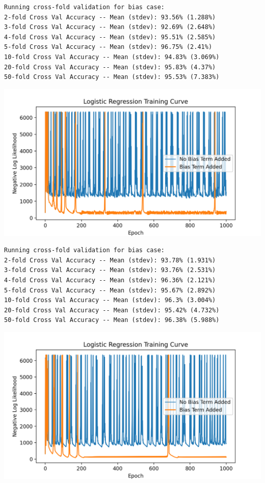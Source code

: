 \documentclass{article}
\theoremstyle{definition}
\begin{document}
\begin{mdframed}[]
    \begin{verbatim}
Running cross-fold validation for bias case:
2-fold Cross Val Accuracy -- Mean (stdev): 93.56% (1.288%)
3-fold Cross Val Accuracy -- Mean (stdev): 92.69% (2.648%)
4-fold Cross Val Accuracy -- Mean (stdev): 95.51% (2.585%)
5-fold Cross Val Accuracy -- Mean (stdev): 96.75% (2.41%)
10-fold Cross Val Accuracy -- Mean (stdev): 94.83% (3.069%)
20-fold Cross Val Accuracy -- Mean (stdev): 95.83% (4.37%)
50-fold Cross Val Accuracy -- Mean (stdev): 95.53% (7.383%)  
    \end{verbatim}
    \includegraphics[scale=0.75]{figures/step_size_0.1.png}
\end{mdframed}
\begin{mdframed}[]
    \begin{verbatim}
Running cross-fold validation for bias case:
2-fold Cross Val Accuracy -- Mean (stdev): 93.78% (1.931%)
3-fold Cross Val Accuracy -- Mean (stdev): 93.76% (2.531%)
4-fold Cross Val Accuracy -- Mean (stdev): 96.36% (2.121%)
5-fold Cross Val Accuracy -- Mean (stdev): 95.67% (2.892%)
10-fold Cross Val Accuracy -- Mean (stdev): 96.3% (3.004%)
20-fold Cross Val Accuracy -- Mean (stdev): 95.42% (4.732%)
50-fold Cross Val Accuracy -- Mean (stdev): 96.38% (5.988%)
    \end{verbatim}
    \includegraphics[scale=0.75]{figures/step_size_0.01.png}
\end{mdframed}
\end{document}

